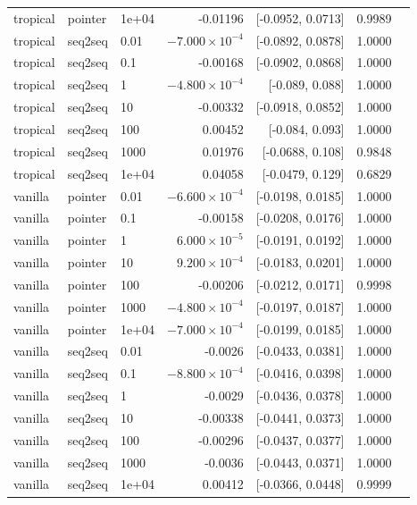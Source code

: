 \documentclass[10pt]{article}
\begin{document}
{\begin{longtable}{lllrrrl}
tropical & pointer & 1e+04 & -0.01196 & [-0.0952, 0.0713] & 0.9989 & \\
tropical & seq2seq & 0.01 & $-7.000\times10^{-4}$ & [-0.0892, 0.0878] & 1.0000 & \\
tropical & seq2seq & 0.1 & -0.00168 & [-0.0902, 0.0868] & 1.0000 & \\
tropical & seq2seq & 1 & $-4.800\times10^{-4}$ & [-0.089, 0.088] & 1.0000 & \\
tropical & seq2seq & 10 & -0.00332 & [-0.0918, 0.0852] & 1.0000 & \\
tropical & seq2seq & 100 & 0.00452 & [-0.084, 0.093] & 1.0000 & \\
tropical & seq2seq & 1000 & 0.01976 & [-0.0688, 0.108] & 0.9848 & \\
tropical & seq2seq & 1e+04 & 0.04058 & [-0.0479, 0.129] & 0.6829 & \\
vanilla & pointer & 0.01 & $-6.600\times10^{-4}$ & [-0.0198, 0.0185] & 1.0000 & \\
vanilla & pointer & 0.1 & -0.00158 & [-0.0208, 0.0176] & 1.0000 & \\
vanilla & pointer & 1 & $6.000\times10^{-5}$ & [-0.0191, 0.0192] & 1.0000 & \\
vanilla & pointer & 10 & $9.200\times10^{-4}$ & [-0.0183, 0.0201] & 1.0000 & \\
vanilla & pointer & 100 & -0.00206 & [-0.0212, 0.0171] & 0.9998 & \\
vanilla & pointer & 1000 & $-4.800\times10^{-4}$ & [-0.0197, 0.0187] & 1.0000 & \\
vanilla & pointer & 1e+04 & $-7.000\times10^{-4}$ & [-0.0199, 0.0185] & 1.0000 & \\
vanilla & seq2seq & 0.01 & -0.0026 & [-0.0433, 0.0381] & 1.0000 & \\
vanilla & seq2seq & 0.1 & $-8.800\times10^{-4}$ & [-0.0416, 0.0398] & 1.0000 & \\
vanilla & seq2seq & 1 & -0.0029 & [-0.0436, 0.0378] & 1.0000 & \\
vanilla & seq2seq & 10 & -0.00338 & [-0.0441, 0.0373] & 1.0000 & \\
vanilla & seq2seq & 100 & -0.00296 & [-0.0437, 0.0377] & 1.0000 & \\
vanilla & seq2seq & 1000 & -0.0036 & [-0.0443, 0.0371] & 1.0000 & \\
vanilla & seq2seq & 1e+04 & 0.00412 & [-0.0366, 0.0448] & 0.9999 & \\
\bottomrule
\end{longtable}
}
\end{document}
